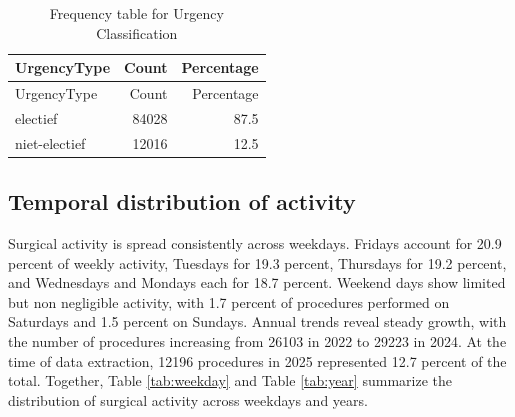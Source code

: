 \documentclass[
]{article}
\begin{document}
\begin{longtable}[]{@{}lrr@{}}
\caption{Frequency table for Urgency Classification
\label{tab:urgencytype}}\tabularnewline
\toprule\noalign{}
UrgencyType & Count & Percentage \\
\midrule\noalign{}
\endfirsthead
\toprule\noalign{}
UrgencyType & Count & Percentage \\
\midrule\noalign{}
\endhead
\bottomrule\noalign{}
\endlastfoot
electief & 84028 & 87.5 \\
niet-electief & 12016 & 12.5 \\
\end{longtable}

\subsection{Temporal distribution of
activity}\label{temporal-distribution-of-activity}

Surgical activity is spread consistently across weekdays. Fridays
account for 20.9 percent of weekly activity, Tuesdays for 19.3 percent,
Thursdays for 19.2 percent, and Wednesdays and Mondays each for 18.7
percent. Weekend days show limited but non negligible activity, with 1.7
percent of procedures performed on Saturdays and 1.5 percent on Sundays.
Annual trends reveal steady growth, with the number of procedures
increasing from 26103 in 2022 to 29223 in 2024. At the time of data
extraction, 12196 procedures in 2025 represented 12.7 percent of the
total. Together, Table \ref{tab:weekday} and Table \ref{tab:year}
summarize the distribution of surgical activity across weekdays and
years.
\end{document}
